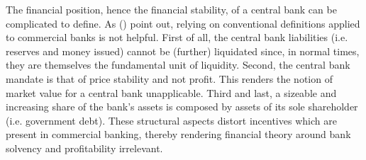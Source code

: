 \documentclass[american]{scrartcl}
\newcommand{\citein}[1]{\citeauthor{#1} (\citeyear{#1})}
\begin{document}
The financial position, hence the financial stability, of a central bank can be complicated to define. As \citein{Hall2015} point out, relying on conventional definitions applied to commercial banks is not helpful. First of all, the central bank liabilities (i.e. reserves and money issued) cannot be (further) liquidated since, in normal times, they are themselves the fundamental unit of liquidity. Second, the central bank mandate is that of price stability and not profit. This renders the notion of market value for a central bank unapplicable. Third and last, a sizeable and increasing share of the bank's assets is composed by assets of its sole shareholder (i.e. government debt). These structural aspects distort incentives which are present in commercial banking, thereby rendering financial theory around bank solvency and profitability irrelevant.




\newpage
\nocite{*}
\printbibliography
\end{document}
